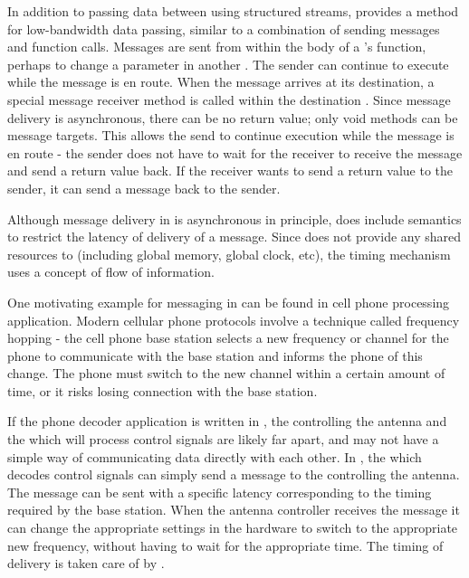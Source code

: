In addition to passing data between {\filters} using structured
streams, {\StreamIt} provides a method for low-bandwidth data
passing, similar to a combination of sending messages and function
calls. Messages are sent from within the body of a {\filter}'s
{\work} function, perhaps to change a parameter in another
{\filter}. The sender can continue to execute while the message is
en route. When the message arrives at its destination, a special
message receiver method is called within the destination
{\filter}. Since message delivery is asynchronous, there can be no
return value; only void methods can be message targets. This
allows the send to continue execution while the message is en
route - the sender does not have to wait for the receiver to
receive the message and send a return value back. If the receiver
wants to send a return value to the sender, it can send a message
back to the sender.

Although message delivery in {\StreamIt} is asynchronous in
principle, {\StreamIt} does include semantics to restrict the
latency of delivery of a message. Since {\StreamIt} does not
provide any shared resources to {\filters} (including global
memory, global clock, etc), the timing mechanism uses a concept of
flow of information.

One motivating example for messaging in {\StreamIt} can be found in
cell phone processing application. Modern cellular phone protocols
involve a technique called frequency hopping - the cell phone base
station selects a new frequency or channel for the phone to
communicate with the base station and informs the phone of this
change.  The phone must switch to the new channel within a certain
amount of time, or it risks losing connection with the base
station.

If the phone decoder application is written in {\StreamIt}, the
{\filter} controlling the antenna and the {\filter} which will process
control signals are likely far apart, and may not have a simple
way of communicating data directly with each other. In {\StreamIt},
the {\filter} which decodes control signals can simply send a
message to the {\filter} controlling the antenna. The message can be
sent with a specific latency corresponding to the timing required
by the base station. When the antenna controller receives the
message it can change the appropriate settings in the hardware to
switch to the appropriate new frequency, without having to wait
for the appropriate time. The timing of delivery is taken care of
by {\StreamIt}.

